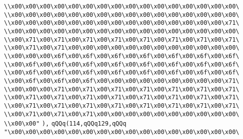 \verb|\\x00\x00\x00\x00\x00\x00\x00\x00\x00\x00\x00\x00\x00\x00\x00\x00\|\newline
\verb|\\x00\x00\x00\x00\x00\x00\x00\x00\x00\x00\x00\x00\x00\x00\x00\x00\|\newline
\verb|\\x00\x00\x00\x00\x00\x00\x00\x00\x00\x00\x00\x00\x00\x00\x00\x71\|\newline
\verb|\\x00\x00\x00\x00\x00\x00\x00\x00\x00\x00\x00\x00\x00\x00\x00\x00\|\newline
\verb|\\x00\x71\x00\x71\x00\x71\x00\x71\x00\x71\x00\x71\x00\x71\x00\x71\|\newline
\verb|\\x00\x71\x00\x71\x00\x00\x00\x00\x00\x00\x00\x00\x00\x00\x00\x00\|\newline
\verb|\\x00\x00\x00\x6f\x00\x6f\x00\x6f\x00\x6f\x00\x6f\x00\x6f\x00\x6f\|\newline
\verb|\\x00\x6f\x00\x6f\x00\x6f\x00\x6f\x00\x6f\x00\x6f\x00\x6f\x00\x6f\|\newline
\verb|\\x00\x6f\x00\x6f\x00\x6f\x00\x6f\x00\x6f\x00\x6f\x00\x6f\x00\x6f\|\newline
\verb|\\x00\x6f\x00\x6f\x00\x6f\x00\x00\x00\x00\x00\x00\x00\x00\x00\x71\|\newline
\verb|\\x00\x00\x00\x71\x00\x71\x00\x71\x00\x71\x00\x71\x00\x71\x00\x71\|\newline
\verb|\\x00\x71\x00\x71\x00\x71\x00\x71\x00\x71\x00\x71\x00\x71\x00\x71\|\newline
\verb|\\x00\x71\x00\x71\x00\x71\x00\x71\x00\x71\x00\x71\x00\x71\x00\x71\|\newline
\verb|\\x00\x71\x00\x71\x00\x71\x00\x00\x00\x00\x00\x00\x00\x00\x00\x00\|\newline
\verb|\\x00\x00"|\newline
\verb|),|\newline
\verb|qQQq(114,qQQq129,qQQq|\newline
\verb|"\x00\x00\x00\x00\x00\x00\x00\x00\x00\x00\x00\x00\x00\x00\x00\x00\|\newline
